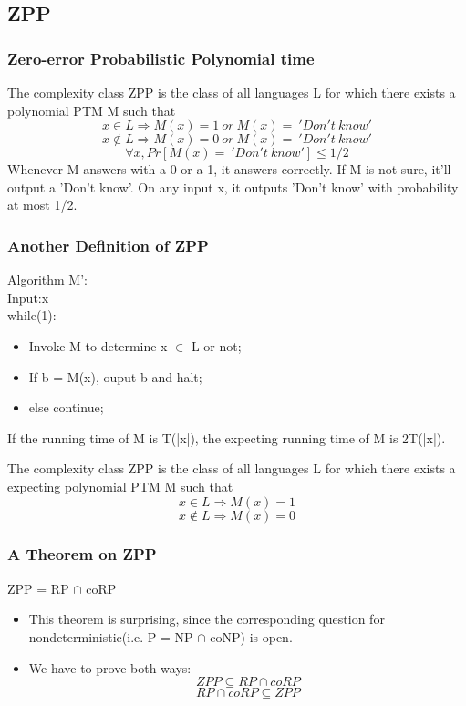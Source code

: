 \documentclass{beamer}
\begin{document}
\subsection{ZPP}
\begin{frame}
\frametitle{Zero-error Probabilistic Polynomial time}
\begin{definition}[ZPP]
	The complexity class ZPP is the class of all languages L for which there exists a polynomial PTM M such that
	$$
	x \in L \Rightarrow M(x)=1\ or\ M(x) =\ 'Don't\ know'
	$$
	$$
	x \notin L \Rightarrow M(x)=0\ or\ M(x) =\ 'Don't\ know'
	$$
	$$
	\forall x, Pr[M(x) = \ 'Don't\ know'] \leq 1/2
	$$
	Whenever M answers with a 0 or a 1, it answers correctly. If M is not sure, it'll output a 'Don't know'. On any input x, it outputs 'Don't know' with probability at most 1/2.
\end{definition}
\end{frame}
\begin{frame}
\frametitle{Another Definition of ZPP}
{\color{red} Algorithm M'}:\\
{\color{red} Input}:x\\
while(1):\\
\begin{itemize}
	\item Invoke M to determine x $\in$ L or not;
	\item If b = M(x), {\color{red} ouput} b and halt;
	\item else continue;
\end{itemize}
If the running time of M is T(|x|), the expecting running time of M is 2T(|x|). 
\begin{definition}[ZPP]
	The complexity class ZPP is the class of all languages L for which there exists a expecting polynomial PTM M such that
	$$
	x \in L \Rightarrow M(x)=1
	$$
	$$
	x \notin L \Rightarrow M(x)=0
	$$
\end{definition}
\end{frame}
\begin{frame}
\frametitle{A Theorem on ZPP}
\begin{theorem}
	ZPP = RP $\cap$ coRP
\end{theorem}
\begin{itemize}
	\item This theorem is surprising, since the corresponding question for nondeterministic(i.e. P = NP $\cap$ coNP) is open.
	\item We have to prove both ways:
	$$
	ZPP \subseteq RP \cap coRP
	$$
	$$
	RP \cap coRP \subseteq ZPP
	$$
\end{itemize}
\end{frame}
\end{document}
